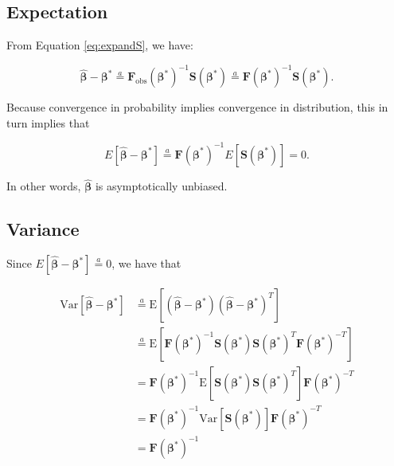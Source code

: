\documentclass[
  12pt,
]{book}
\begin{document}
\subsection{Expectation}\label{expectation}

From Equation \eqref{eq:expandS}, we have:

\begin{equation}
  \hat{\boldsymbol{\beta}}- \boldsymbol{\beta}^*
  \stackrel{a}{=} \boldsymbol{F}_{\text{obs}}(\boldsymbol{\beta}^*)^{-1} \boldsymbol{S}(\boldsymbol{\beta}^*)
  \stackrel{a}{=} \boldsymbol{F}(\boldsymbol{\beta}^*)^{-1} \boldsymbol{S}(\boldsymbol{\beta}^*).
  \label{eq:betaintermsofs}
\end{equation}

Because convergence in probability implies convergence in distribution, this in turn implies that

\begin{equation}
  E[\hat{\boldsymbol{\beta}}- \boldsymbol{\beta}^*]
  \stackrel{a}{=} \boldsymbol{F}(\boldsymbol{\beta}^*)^{-1} E[\boldsymbol{S}(\boldsymbol{\beta}^*)]
  = 0.
\end{equation}

In other words, \(\hat{\boldsymbol{\beta}}\) is asymptotically unbiased.

\subsection{Variance}\label{variance}

Since \(E[\hat{\boldsymbol{\beta}}- \boldsymbol{\beta}^*] \stackrel{a}{=} 0\), we have that

\begin{align}
  {\mathrm{Var}}[\hat{\boldsymbol{\beta}}- \boldsymbol{\beta}^*]
  & \stackrel{a}{=} {\mathrm E}[(\hat{\boldsymbol{\beta}}- \boldsymbol{\beta}^*)(\hat{\boldsymbol{\beta}}- \boldsymbol{\beta}^*)^{T}] \\
  & \stackrel{a}{=} {\mathrm E}[\boldsymbol{F}(\boldsymbol{\beta}^*)^{-1} \boldsymbol{S}(\boldsymbol{\beta}^*)
    \boldsymbol{S}(\boldsymbol{\beta}^*)^{T} \boldsymbol{F}(\boldsymbol{\beta}^*)^{-T}] \\
  & = \boldsymbol{F}(\boldsymbol{\beta}^*)^{-1} {\mathrm E}[\boldsymbol{S}(\boldsymbol{\beta}^*) 
    \boldsymbol{S}(\boldsymbol{\beta}^*)^{T}] \boldsymbol{F}(\boldsymbol{\beta}^*)^{-T} \\
  & = \boldsymbol{F}(\boldsymbol{\beta}^*)^{-1} {\mathrm{Var}}[\boldsymbol{S}(\boldsymbol{\beta}^*)] \boldsymbol{F}(\boldsymbol{\beta}^*)^{-T} \\
  & = \boldsymbol{F}(\boldsymbol{\beta}^*)^{-1}
\end{align}
\end{document}
